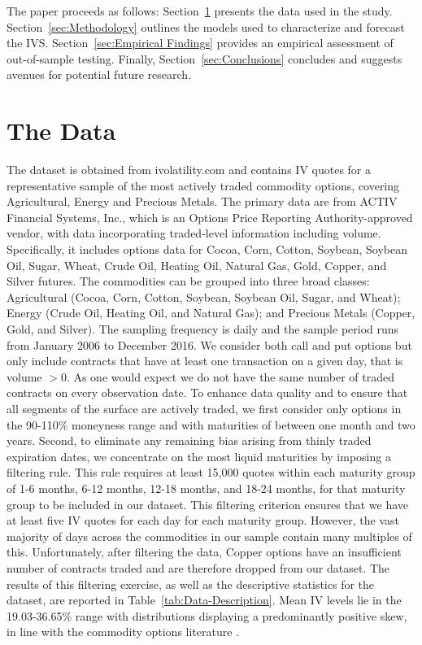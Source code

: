 \documentclass[12pt,a4paper]{article}
\begin{document}
The paper proceeds as follows: Section~\ref{sec:data set} presents the data used in the study. Section~\ref{sec:Methodology} outlines the models used to characterize and forecast the IVS. Section~\ref{sec:Empirical Findings} provides an empirical assessment of out-of-sample testing. Finally, Section~\ref{sec:Conclusions} concludes and suggests avenues for potential future research.

\section{The Data}\label{sec:data set}

The dataset is obtained from ivolatility.com and contains IV quotes for a representative sample of the most actively traded commodity options, covering Agricultural, Energy and Precious Metals. The primary data are from ACTIV Financial Systems, Inc., which is an Options Price Reporting Authority-approved vendor, with data incorporating traded-level information including volume. Specifically, it includes options data for Cocoa, Corn, Cotton, Soybean, Soybean Oil, Sugar, Wheat, Crude Oil, Heating Oil, Natural Gas, Gold, Copper, and Silver futures. The commodities can be grouped into three broad classes: Agricultural (Cocoa, Corn, Cotton, Soybean, Soybean Oil, Sugar, and Wheat); Energy (Crude Oil, Heating Oil, and Natural Gas); and Precious Metals (Copper, Gold, and Silver). The sampling frequency is daily and the sample period runs from January 2006 to December 2016. We consider both call and put options but only include contracts that have at least one transaction on a given day, that is volume $>0$. As one would expect we do not have the same number of traded contracts on every observation date. To enhance data quality and to ensure that all segments of the surface are actively traded, we first consider only options in the 90-110\% moneyness range and with maturities of between one month and two years. Second, to eliminate any remaining bias arising from thinly traded expiration dates, we concentrate on the most liquid maturities by imposing a filtering rule. This rule requires at least 15,000 quotes within each maturity group of 1-6 months, 6-12 months, 12-18 months, and 18-24 months, for that maturity group to be included in our dataset. This filtering criterion ensures that we have at least five IV quotes for each day for each maturity group. However, the vast majority of days across the commodities in our sample contain many multiples of this. Unfortunately, after filtering the data, Copper options have an insufficient number of contracts traded and are therefore dropped from our dataset. The results of this filtering exercise, as well as the descriptive statistics for the dataset, are reported in  Table~\ref{tab:Data-Description}. Mean IV levels lie in the 19.03-36.65\% range with distributions displaying a predominantly positive skew, in line with the commodity options literature \citep{mandelbrot1963new, fama1965behavior}. 
\end{document}

